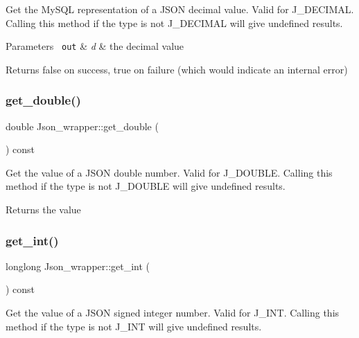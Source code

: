 Get the My\+S\+QL representation of a J\+S\+ON decimal value. Valid for J\+\_\+\+D\+E\+C\+I\+M\+AL. Calling this method if the type is not J\+\_\+\+D\+E\+C\+I\+M\+AL will give undefined results.


\begin{DoxyParams}[1]{Parameters}
\mbox{\texttt{ out}}  & {\em d} & the decimal value \\
\hline
\end{DoxyParams}
\begin{DoxyReturn}{Returns}
false on success, true on failure (which would indicate an internal error) 
\end{DoxyReturn}
\mbox{\label{classJson__wrapper_ac7744701e254af761345535abf8cedd7}} 
\subsubsection{\texorpdfstring{get\+\_\+double()}{get\_double()}}
{\footnotesize\ttfamily double Json\+\_\+wrapper\+::get\+\_\+double (\begin{DoxyParamCaption}{ }\end{DoxyParamCaption}) const}

Get the value of a J\+S\+ON double number. Valid for J\+\_\+\+D\+O\+U\+B\+LE. Calling this method if the type is not J\+\_\+\+D\+O\+U\+B\+LE will give undefined results.

\begin{DoxyReturn}{Returns}
the value 
\end{DoxyReturn}
\mbox{\label{classJson__wrapper_a567c33e8a8dfbc96055e603c0acbd9d4}} 
\subsubsection{\texorpdfstring{get\+\_\+int()}{get\_int()}}
{\footnotesize\ttfamily longlong Json\+\_\+wrapper\+::get\+\_\+int (\begin{DoxyParamCaption}{ }\end{DoxyParamCaption}) const}

Get the value of a J\+S\+ON signed integer number. Valid for J\+\_\+\+I\+NT. Calling this method if the type is not J\+\_\+\+I\+NT will give undefined results.

